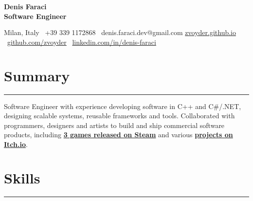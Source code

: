 \documentclass[8.5pt]{article}
\newcommand{\sectionline}{
    \vspace{0pt}
    \hrule
    \vspace{2pt}
}
\newcommand{\cvsection}[1]{
    \section*{#1}
    \sectionline
}
\begin{document}

    {\Huge\textbf{Denis Faraci}}
    \\
    {\textbf{Software Engineer}}

    Milan, Italy \textbar\
    +39 339 1172868 \textbar\
    denis.faraci.dev@gmail.com 
    \newline
    \href{https://zvoyder.github.io}{zvoyder.github.io}
    \textbar\
    \href{https://github.com/zvoyder}{github.com/zvoyder}
    \textbar\
    \href{https://www.linkedin.com/in/denis-faraci/}{linkedin.com/in/denis-faraci}


    \cvsection{Summary}
    
    Software Engineer with experience developing software in C++ and C\#/.NET, designing scalable systems, reusable frameworks and tools.
    Collaborated with programmers, designers and artists to build and ship commercial software products, including \href{https://store.steampowered.com/curator/46010347}{\textbf{3 games released on Steam}} and various \href{https://zvoyder.itch.io/}{\textbf{projects on Itch.io}}.
    

    \cvsection{Skills}
\end{document}
